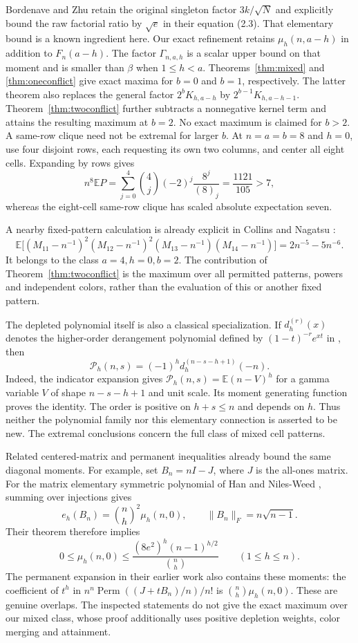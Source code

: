 \documentclass[11pt]{article}
\theoremstyle{definition}
\theoremstyle{remark}
\newcommand{\E}{\mathbb E}
\newcommand{\1}{\mathbf 1}
\begin{document}
Bordenave and Zhu \cite[Lemma 2.1]{BZ} retain the original singleton factor $3k/\sqrt N$ and explicitly bound the raw factorial ratio by $\sqrt e$ in their equation (2.3). That elementary bound is a known ingredient here. Our exact refinement retains $\mu_h(n,a-h)$ in addition to $F_n(a-h)$. The factor $\Gamma_{n,a,h}$ is a scalar upper bound on that moment and is smaller than $\beta$ when $1\le h<a$. Theorems~\ref{thm:mixed} and \ref{thm:oneconflict} give exact maxima for $b=0$ and $b=1$, respectively. The latter theorem also replaces the general factor $2^bK_{h,a-h}$ by $2^{b-1}K_{h,a-h-1}$. Theorem~\ref{thm:twoconflict} further subtracts a nonnegative kernel term and attains the resulting maximum at $b=2$. No exact maximum is claimed for $b>2$. A same-row clique need not be extremal for larger $b$. At $n=a=b=8$ and $h=0$, use four disjoint rows, each requesting its own two columns, and center all eight cells. Expanding by rows gives
\[
n^8\E P=\sum_{j=0}^4\binom4j(-2)^j\frac{8^j}{(8)_j}
=\frac{1121}{105}>7,
\]
whereas the eight-cell same-row clique has scaled absolute expectation seven.

A nearby fixed-pattern calculation is already explicit in Collins and Nagatsu \cite[Remark 7.2, page 478]{CN}:
\[
\E\bigl[(M_{11}-n^{-1})^2(M_{12}-n^{-1})^2
(M_{13}-n^{-1})(M_{14}-n^{-1})\bigr]
=2n^{-5}-5n^{-6}.
\]
It belongs to the class $a=4,h=0,b=2$. The contribution of Theorem~\ref{thm:twoconflict} is the maximum over all permitted patterns, powers and independent colors, rather than the evaluation of this or another fixed pattern.

The depleted polynomial itself is also a classical specialization. If $d_h^{(r)}(x)$ denotes the higher-order derangement polynomial defined by $(1-t)^{-r}e^{xt}$ in \cite[equation (2.22)]{KKJK}, then
\[
\mathcal P_h(n,s)=(-1)^h d_h^{(n-s-h+1)}(-n).
\]
Indeed, the indicator expansion gives $\mathcal P_h(n,s)=\E(n-V)^h$ for a gamma variable $V$ of shape $n-s-h+1$ and unit scale. Its moment generating function proves the identity. The order is positive on $h+s\le n$ and depends on $h$. Thus neither the polynomial family nor this elementary connection is asserted to be new. The extremal conclusions concern the full class of mixed cell patterns.

Related centered-matrix and permanent inequalities already bound the same diagonal moments. For example, set $B_n=nI-J$, where $J$ is the all-ones matrix. For the matrix elementary symmetric polynomial of Han and Niles-Weed \cite[equation (2), Theorem 1.2]{HNcentered}, summing over injections gives
\[
e_h(B_n)=\binom nh^2\mu_h(n,0),\qquad
\|B_n\|_F=n\sqrt{n-1}.
\]
Their theorem therefore implies
\[
0\le\mu_h(n,0)\le
\frac{(8e^2)^h(n-1)^{h/2}}{\binom nh}\qquad(1\le h\le n).
\]
The permanent expansion in their earlier work \cite[equation (29), Lemma 5.5 in the inspected preprint]{HNmixtures} also contains these moments: the coefficient of $t^h$ in
$n^n\operatorname{Perm}((J+tB_n)/n)/n!$ is $\binom nh\mu_h(n,0)$.
These are genuine overlaps. The inspected statements do not give the exact maximum over our mixed class, whose proof additionally uses positive depletion weights, color merging and attainment.
\end{document}
